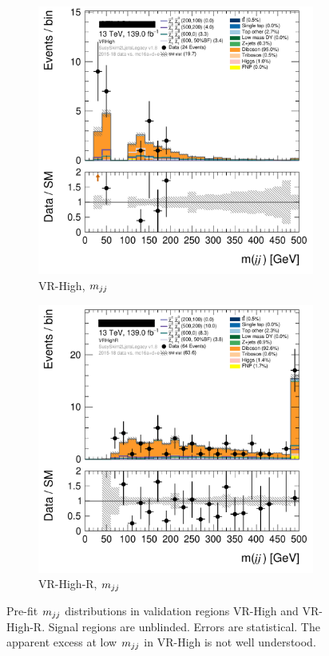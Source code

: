 \begin{figure}[tp]
\centering
\begin{subfigure}{0.48\textwidth}
\centering
\includegraphics[width=\textwidth]{figures/2ljets_def_mjj_VRHigh.png}
\caption{VR-High, $\mjj$}
\end{subfigure}
\hfill
\begin{subfigure}{0.48\textwidth}
\centering
\includegraphics[width=\textwidth]{figures/2ljets_def_mjj_VRHighR.png}
\caption{VR-High-R, $\mjj$}
\end{subfigure}
\caption[
Pre-fit $\mjj$ distributions in validation regions VR-High and VR-High-R
]{%
Pre-fit $\mjj$ distributions in validation regions VR-High and VR-High-R.
Signal regions are unblinded.
Errors are statistical.
The apparent excess at low $\mjj$ in VR-High is not well understood.
}
\label{fig:2ljets_high_mjj_vrhigh}
\end{figure}

